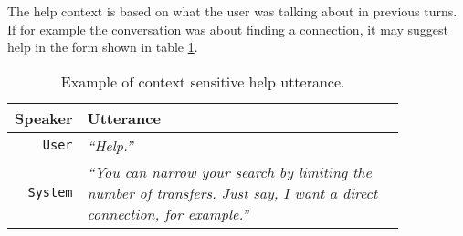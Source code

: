 The help context is based on what the user was talking about in previous turns.
If for example the conversation was about finding a connection, it may suggest help in the form shown in table \ref{table:help}.

\begin{table}[h!]
\centering
\begin{tabular}{ | r | p{0.85\linewidth} | } \hline
	Speaker & Utterance \\ \hline
	\texttt{User} & \textit{``Help.''} \\ \hline
	\texttt{System} & \textit{``You can narrow your search by limiting the number of transfers.
	Just say, I want a direct connection, for example.''} \\ \hline
\end{tabular}
\caption[Context sensitive help]{Example of context sensitive help utterance.}
\label{table:help}
\end{table}






